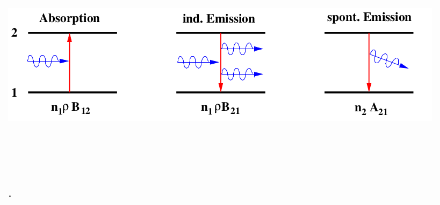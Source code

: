 \begin{figure}
  \centering
  \includegraphics[height = 6cm]{Pics von Buddy/absemi.png}
  \caption{\cite{anleitung}.}
  \label{fig:absemi}
\end{figure}


\cite{anleitung}
